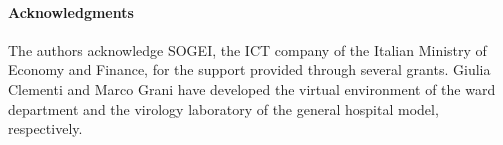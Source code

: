 \paragraph*{Acknowledgments}

The authors acknowledge SOGEI, the ICT company of the Italian Ministry of Economy and Finance, for the support provided through several grants. Giulia Clementi and Marco Grani have developed the virtual environment of the ward department and the virology laboratory of the general hospital model, respectively.
